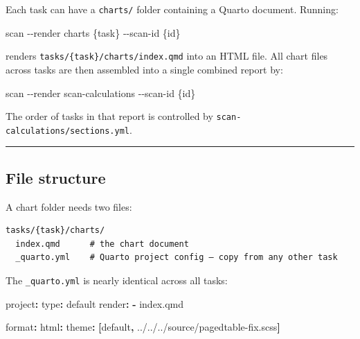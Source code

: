 \documentclass[
  letterpaper,
  DIV=11,
  numbers=noendperiod]{scrreprt}
\newenvironment{Shaded}{\begin{snugshade}}{\end{snugshade}}
\newcommand{\AttributeTok}[1]{\textcolor[rgb]{0.40,0.45,0.13}{#1}}
\newcommand{\ExtensionTok}[1]{\textcolor[rgb]{0.00,0.23,0.31}{#1}}
\newcommand{\FunctionTok}[1]{\textcolor[rgb]{0.28,0.35,0.67}{#1}}
\newcommand{\KeywordTok}[1]{\textcolor[rgb]{0.00,0.23,0.31}{\textbf{#1}}}
\newcommand{\NormalTok}[1]{\textcolor[rgb]{0.00,0.23,0.31}{#1}}
\begin{document}
Each task can have a \texttt{charts/} folder containing a Quarto
document. Running:

\begin{Shaded}
\begin{Highlighting}[]
\ExtensionTok{scan} \AttributeTok{{-}{-}render}\NormalTok{ charts \{task\} }\AttributeTok{{-}{-}scan{-}id}\NormalTok{ \{id\}}
\end{Highlighting}
\end{Shaded}

renders \texttt{tasks/\{task\}/charts/index.qmd} into an HTML file. All
chart files across tasks are then assembled into a single combined
report by:

\begin{Shaded}
\begin{Highlighting}[]
\ExtensionTok{scan} \AttributeTok{{-}{-}render}\NormalTok{ scan{-}calculations }\AttributeTok{{-}{-}scan{-}id}\NormalTok{ \{id\}}
\end{Highlighting}
\end{Shaded}

The order of tasks in that report is controlled by
\texttt{scan-calculations/sections.yml}.

\begin{center}\rule{0.5\linewidth}{0.5pt}\end{center}

\subsection{File structure}\label{file-structure}

A chart folder needs two files:

\begin{verbatim}
tasks/{task}/charts/
  index.qmd      # the chart document
  _quarto.yml    # Quarto project config — copy from any other task
\end{verbatim}

The \texttt{\_quarto.yml} is nearly identical across all tasks:

\begin{Shaded}
\begin{Highlighting}[]
\FunctionTok{project}\KeywordTok{:}
\AttributeTok{  }\FunctionTok{type}\KeywordTok{:}\AttributeTok{ default}
\AttributeTok{  }\FunctionTok{render}\KeywordTok{:}
\AttributeTok{    }\KeywordTok{{-}}\AttributeTok{ index.qmd}

\FunctionTok{format}\KeywordTok{:}
\AttributeTok{  }\FunctionTok{html}\KeywordTok{:}
\AttributeTok{    }\FunctionTok{theme}\KeywordTok{:}\AttributeTok{ }\KeywordTok{[}\AttributeTok{default}\KeywordTok{,}\AttributeTok{ ../../../source/pagedtable{-}fix.scss}\KeywordTok{]}
\end{Highlighting}
\end{Shaded}
\end{document}
